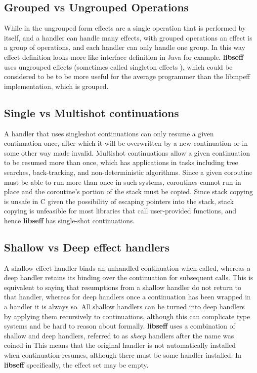 \documentclass[logo,bsc,singlespacing,parskip,online]{infthesis}
\begin{document}
\subsection{Grouped vs Ungrouped Operations}

While in the ungrouped form effects are a single operation that is performed by itself, and a handler can handle many effects, with grouped operations an effect is a group of operations, and each handler can only handle one group. In this way effect definition looks more like interface definition in Java for example. \textbf{libseff} uses ungrouped effects (sometimes called singleton effects \citep{effekt-website}), which could be considered to be to be more useful for the average programmer than the libmpeff implementation, which is grouped.

\subsection{Single vs Multishot continuations}

A handler that uses singleshot continuations can only resume a given continuation once, after which it will be overwritten by a new continuation or in some other way made invalid. Multishot continuations allow a given continuation to be resumed more than once, which has applications in tasks including tree searches, back-tracking, and non-deterministic algorithms. Since a given coroutine must be able to run more than once in such systems, coroutines cannot run in place and the coroutine's portion of the stack must be copied. Since stack copying is unsafe in C given the possibility of escaping pointers into the stack, stack copying is unfeasible for most libraries that call user-provided functions, and hence \textbf{libseff} has single-shot continuations.

\subsection{Shallow vs Deep effect handlers}

A shallow effect handler binds an unhandled continuation when called, whereas a deep handler retains its binding over the continuation for subsequent calls. This is equivalent to saying that resumptions from a shallow handler do not return to that handler, whereas for deep handlers once a continuation has been wrapped in a handler it is always so. All shallow handlers can be turned into deep handlers by applying them recursively to continuations, although this can complicate type systems and be hard to reason about formally. \textbf{libseff} uses a combination of shallow and deep handlers, referred to as \textit{sheep} handlers after the name was coined in \textcite{wasmFX}
This means that the original handler is not automatically installed when continuation resumes, although there must be some handler installed. In \textbf{libseff} specifically, the effect set may be empty. \citep{libseff_paper}
\end{document}
